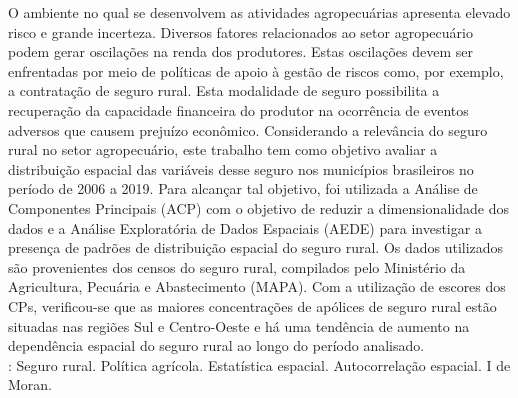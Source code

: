 O ambiente no qual se desenvolvem as atividades agropecuárias apresenta elevado risco e grande incerteza. Diversos fatores relacionados ao setor agropecuário podem gerar oscilações na renda dos produtores. Estas oscilações devem ser enfrentadas por meio de políticas de apoio à gestão de riscos como, por exemplo, a contratação de seguro rural. Esta modalidade de seguro possibilita a recuperação da capacidade financeira do produtor na ocorrência de eventos adversos que causem prejuízo econômico. Considerando a relevância do seguro rural no setor agropecuário, este trabalho tem como objetivo avaliar a distribuição espacial das variáveis desse seguro nos municípios brasileiros no período de 2006 a 2019. Para alcançar tal objetivo, foi utilizada a Análise de Componentes Principais (ACP) com o objetivo de reduzir a dimensionalidade dos dados e a Análise Exploratória de Dados Espaciais (AEDE) para investigar a presença de padrões de distribuição espacial do seguro rural. Os dados utilizados são provenientes dos censos do seguro rural, compilados pelo Ministério da Agricultura, Pecuária e Abastecimento (MAPA). Com a utilização de escores dos CPs, verificou-se que as maiores concentrações de apólices de seguro rural estão situadas nas regiões Sul e Centro-Oeste e há uma tendência de aumento na dependência espacial do seguro rural ao longo do período analisado. \\
\newline
{}: Seguro rural. Política agrícola. Estatística espacial. Autocorrelação espacial. I de Moran.
